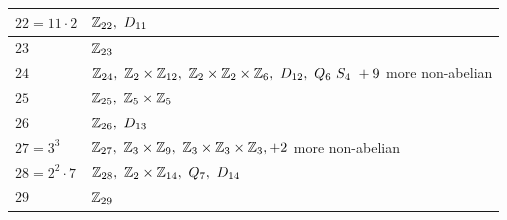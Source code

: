 \begin{table}[ht!]
\begin{tabular}{|l|p{}|}
         $22=11\cdot 2$ & $\Z_{22}, \ D_{11}$ \\ \hline
         $23$ & ${\mathbb{ Z}}_{23}$ \\ \hline
         $24$ & $\Z_{24}, \ \Z_2\times \Z_{12}, \ \Z_2\times \Z_2\times \Z_6, \ D_{12}, \ Q_6 \ S_{4} \ +9$ more non-abelian \\ \hline
         $25$ & $\Z_{25}, \ \Z_5\times \Z_5$ \\ \hline
         $26$ & $\Z_{26}, \ D_{13}$ \\ \hline
         $27=3^3$ & $\Z_{27}, \ \Z_3\times \Z_9, \ \Z_3\times \Z_3\times \Z_3, + 2$ more non-abelian \\ \hline
         $28=2^2\cdot 7$ & $\Z_{28}, \ \Z_2\times \Z_{14}, \ Q_7, \ D_{14}$ \\ \hline
         $29$ & ${\mathbb{ Z}}_{29}$ \\ \hline
    \end{tabular}
\end{table} \steezybreak
\newpage

